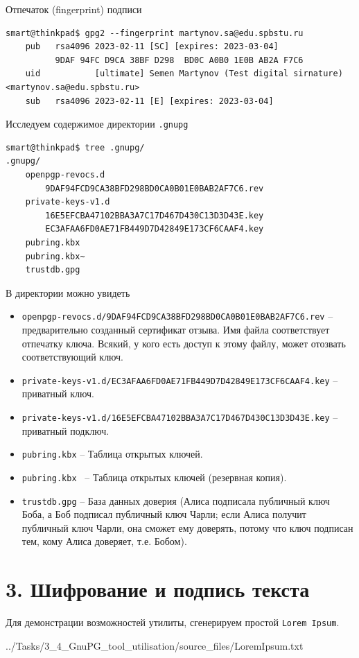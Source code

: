 Отпечаток (fingerprint) подписи
\begin{Verbatim}[frame=single]
    smart@thinkpad$ gpg2 --fingerprint martynov.sa@edu.spbstu.ru
    pub   rsa4096 2023-02-11 [SC] [expires: 2023-03-04]
          9DAF 94FC D9CA 38BF D298  BD0C A0B0 1E0B AB2A F7C6
    uid           [ultimate] Semen Martynov (Test digital sirnature) <martynov.sa@edu.spbstu.ru>
    sub   rsa4096 2023-02-11 [E] [expires: 2023-03-04]
\end{Verbatim}

Исследуем содержимое директории \texttt{.gnupg}
\begin{Verbatim}[frame=single]
smart@thinkpad$ tree .gnupg/
.gnupg/
    openpgp-revocs.d
        9DAF94FCD9CA38BFD298BD0CA0B01E0BAB2AF7C6.rev
    private-keys-v1.d
        16E5EFCBA47102BBA3A7C17D467D430C13D3D43E.key
        EC3AFAA6FD0AE71FB449D7D42849E173CF6CAAF4.key
    pubring.kbx
    pubring.kbx~
    trustdb.gpg
\end{Verbatim}

В директории можно увидеть
\begin{itemize}
    \item \texttt{openpgp-revocs.d/9DAF94FCD9CA38BFD298BD0CA0B01E0BAB2AF7C6.rev} --  предварительно созданный сертификат отзыва. Имя файла соответствует отпечатку ключа. Всякий, у кого есть доступ к этому файлу, может отозвать соответствующий ключ.
    \item \texttt{private-keys-v1.d/EC3AFAA6FD0AE71FB449D7D42849E173CF6CAAF4.key} -- приватный ключ.
    \item \texttt{private-keys-v1.d/16E5EFCBA47102BBA3A7C17D467D430C13D3D43E.key} -- приватный подключ.
    \item \texttt{pubring.kbx} -- Таблица открытых ключей.
    \item \texttt{pubring.kbx~} -- Таблица открытых ключей (резервная копия).
    \item \texttt{trustdb.gpg} -- База данных доверия (Алиса подписала публичный ключ Боба, а Боб подписал публичный ключ Чарли; если Алиса получит публичный ключ Чарли, она сможет ему доверять, потому что ключ подписан тем, кому Алиса доверяет, т.е. Бобом).
\end{itemize}

\section*{3. Шифрование и подпись текста}
Для демонстрации возможностей утилиты, сгенерируем простой \texttt{Lorem Ipsum}.

{../Tasks/3_4_GnuPG_tool_utilisation/source_files/LoremIpsum.txt}

